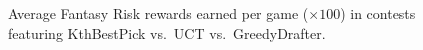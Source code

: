 \documentclass[letterpaper]{article}
\numberwithin{equation}{section}
\numberwithin{theorem}{section}
\numberwithin{lemma}{section}
\numberwithin{df}{section}
\begin{document}
\begin{figure}[t]
\centering
{}\hspace{5pt}
\caption[]{Average Fantasy Risk rewards earned per game ($\times 100$) in contests featuring KthBestPick vs.~UCT vs.~GreedyDrafter.}
\label{fig:FantRisk2}
\end{figure}


\end{document}
